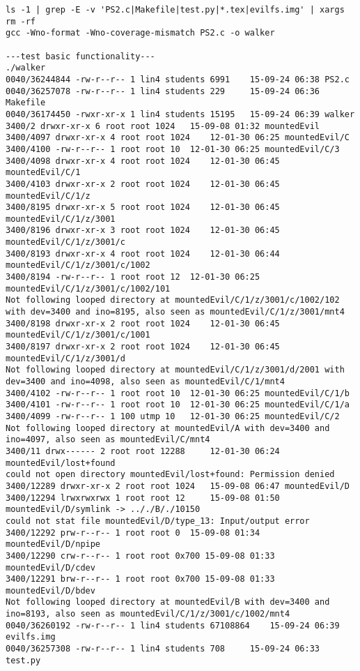 \documentclass[12pt]{article}
\begin{document}
\begin{lstlisting}
ls -1 | grep -E -v 'PS2.c|Makefile|test.py|*.tex|evilfs.img' | xargs rm -rf
gcc -Wno-format -Wno-coverage-mismatch PS2.c -o walker

---test basic functionality---
./walker
0040/36244844 -rw-r--r-- 1 lin4 students 6991	 15-09-24 06:38 PS2.c
0040/36257078 -rw-r--r-- 1 lin4 students 229	 15-09-24 06:36 Makefile
0040/36174450 -rwxr-xr-x 1 lin4 students 15195	 15-09-24 06:39 walker
3400/2 drwxr-xr-x 6 root root 1024	 15-09-08 01:32 mountedEvil
3400/4097 drwxr-xr-x 4 root root 1024	 12-01-30 06:25 mountedEvil/C
3400/4100 -rw-r--r-- 1 root root 10	 12-01-30 06:25 mountedEvil/C/3
3400/4098 drwxr-xr-x 4 root root 1024	 12-01-30 06:45 mountedEvil/C/1
3400/4103 drwxr-xr-x 2 root root 1024	 12-01-30 06:45 mountedEvil/C/1/z
3400/8195 drwxr-xr-x 5 root root 1024	 12-01-30 06:45 mountedEvil/C/1/z/3001
3400/8196 drwxr-xr-x 3 root root 1024	 12-01-30 06:45 mountedEvil/C/1/z/3001/c
3400/8193 drwxr-xr-x 4 root root 1024	 12-01-30 06:44 mountedEvil/C/1/z/3001/c/1002
3400/8194 -rw-r--r-- 1 root root 12	 12-01-30 06:25 mountedEvil/C/1/z/3001/c/1002/101
Not following looped directory at mountedEvil/C/1/z/3001/c/1002/102 with dev=3400 and ino=8195, also seen as mountedEvil/C/1/z/3001/mnt4
3400/8198 drwxr-xr-x 2 root root 1024	 12-01-30 06:45 mountedEvil/C/1/z/3001/c/1001
3400/8197 drwxr-xr-x 2 root root 1024	 12-01-30 06:45 mountedEvil/C/1/z/3001/d
Not following looped directory at mountedEvil/C/1/z/3001/d/2001 with dev=3400 and ino=4098, also seen as mountedEvil/C/1/mnt4
3400/4102 -rw-r--r-- 1 root root 10	 12-01-30 06:25 mountedEvil/C/1/b
3400/4101 -rw-r--r-- 1 root root 10	 12-01-30 06:25 mountedEvil/C/1/a
3400/4099 -rw-r--r-- 1 100 utmp 10	 12-01-30 06:25 mountedEvil/C/2
Not following looped directory at mountedEvil/A with dev=3400 and ino=4097, also seen as mountedEvil/C/mnt4
3400/11 drwx------ 2 root root 12288	 12-01-30 06:24 mountedEvil/lost+found
could not open directory mountedEvil/lost+found: Permission denied
3400/12289 drwxr-xr-x 2 root root 1024	 15-09-08 06:47 mountedEvil/D
3400/12294 lrwxrwxrwx 1 root root 12	 15-09-08 01:50 mountedEvil/D/symlink -> .././B/./10150
could not stat file mountedEvil/D/type_13: Input/output error
3400/12292 prw-r--r-- 1 root root 0	 15-09-08 01:34 mountedEvil/D/npipe
3400/12290 crw-r--r-- 1 root root 0x700 15-09-08 01:33 mountedEvil/D/cdev
3400/12291 brw-r--r-- 1 root root 0x700 15-09-08 01:33 mountedEvil/D/bdev
Not following looped directory at mountedEvil/B with dev=3400 and ino=8193, also seen as mountedEvil/C/1/z/3001/c/1002/mnt4
0040/36260192 -rw-r--r-- 1 lin4 students 67108864	 15-09-24 06:39 evilfs.img
0040/36257308 -rw-r--r-- 1 lin4 students 708	 15-09-24 06:33 test.py


\end{lstlisting}
\end{document}
